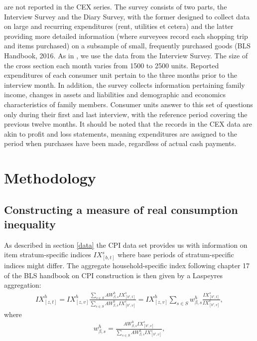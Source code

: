 \documentclass{article}
\begin{document}
are not reported in the CEX series.  The survey consists of two parts, the Interview Survey and the Diary Survey, with the former designed to collect data on large and recurring expenditures (rent, utilities et cetera) and the latter providing more detailed information (where surveyees record each shopping trip and items purchased)  on a subsample of small, frequently purchased goods (BLS Handbook, 2016. As in \cite{Coibion2017InnocentInequality}, we use the data from the Interview Survey. The size of the cross section each month varies from 1500  to 2500 units. Reported expenditures of each consumer unit pertain to the three months prior to the interview month. In addition, the survey collects information pertaining family income, changes in assets and liabilities and demographic and economics characteristics of family members. Consumer units answer to this set of questions only during their first and last interview, with the reference period covering the previous twelve months. It should be noted that the records in the CEX data are akin to profit and loss statements, meaning expenditures are assigned to the period when purchases have been made, regardless of actual cash payments.  


\section{Methodology}
\subsection{Constructing a measure of real consumption inequality}\label{method}
As described in section \ref{data} the CPI data set provides us with information on item stratum-specific indices $IX^s_{[b,t]}$ where base periods of stratum-specific indices might differ. %
The aggregate household-specific index following chapter 17 of the BLS handbook on CPI construction \citep{BureauofLaborStatisticsBLSIndex} is then given by a Laspeyres aggregation:
\begin{align}\label{agg_index_hh}
    IX^h_{[z,t]}= IX^h_{[z,v]}\frac{\sum_{s\in S}AW^h_{\beta,s}IX^s_{[b^s,t]}}{\sum_{s\in S}AW^h_{\beta,s}IX^s_{[b^s,v]}}=IX^h_{[z,v]}\sum_{s\in S}w^h_{\beta,s}\frac{IX^s_{[b^s,t]}}{IX^s_{[b^s,v]}},
\end{align}
where 
\begin{align*}
    w^h_{\beta,s}= \frac{AW^h_{\beta,s} IX^s_{[b^s,v]}}{\sum_{s\in S}AW^h_{\beta,s} IX^s_{[b^s,v]}},
\end{align*}
\end{document}
